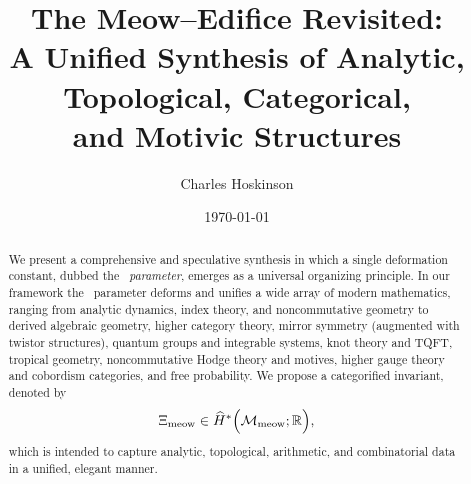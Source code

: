 \documentclass[11pt,a4paper]{article}
\title{The Meow--Edifice Revisited:\\
A Unified Synthesis of Analytic, Topological, Categorical,\\
and Motivic Structures}
\author{Charles Hoskinson}
\date{\today}
\newcommand{\meow}{\mathrm{meow}}
\newcommand{\Mmeow}{\mathcal{M}_{\meow}}
\theoremstyle{plain}
\theoremstyle{definition}
\theoremstyle{remark}
\begin{document}
\maketitle

\begin{abstract}
We present a comprehensive and speculative synthesis in which a single deformation constant, dubbed the \emph{\meow\ parameter}, emerges as a universal organizing principle. In our framework the \meow\ parameter deforms and unifies a wide array of modern mathematics, ranging from analytic dynamics, index theory, and noncommutative geometry to derived algebraic geometry, higher category theory, mirror symmetry (augmented with twistor structures), quantum groups and integrable systems, knot theory and TQFT, tropical geometry, noncommutative Hodge theory and motives, higher gauge theory and cobordism categories, and free probability. We propose a categorified invariant, denoted by 
\[
    \Xi_{\meow} \in \widehat{H}^{*}\Bigl(\Mmeow; \mathbb{R}\Bigr),
\]
which is intended to capture analytic, topological, arithmetic, and combinatorial data in a unified, elegant manner.
\end{abstract}

\tableofcontents

\end{document}
